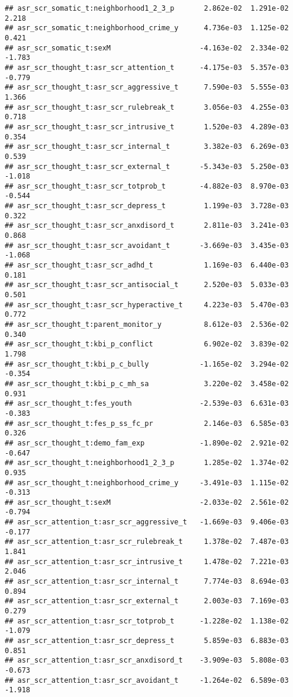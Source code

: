 \documentclass[
]{article}
\begin{document}
\begin{verbatim}
## asr_scr_somatic_t:neighborhood1_2_3_p       2.862e-02  1.291e-02   2.218
## asr_scr_somatic_t:neighborhood_crime_y      4.736e-03  1.125e-02   0.421
## asr_scr_somatic_t:sexM                     -4.163e-02  2.334e-02  -1.783
## asr_scr_thought_t:asr_scr_attention_t      -4.175e-03  5.357e-03  -0.779
## asr_scr_thought_t:asr_scr_aggressive_t      7.590e-03  5.555e-03   1.366
## asr_scr_thought_t:asr_scr_rulebreak_t       3.056e-03  4.255e-03   0.718
## asr_scr_thought_t:asr_scr_intrusive_t       1.520e-03  4.289e-03   0.354
## asr_scr_thought_t:asr_scr_internal_t        3.382e-03  6.269e-03   0.539
## asr_scr_thought_t:asr_scr_external_t       -5.343e-03  5.250e-03  -1.018
## asr_scr_thought_t:asr_scr_totprob_t        -4.882e-03  8.970e-03  -0.544
## asr_scr_thought_t:asr_scr_depress_t         1.199e-03  3.728e-03   0.322
## asr_scr_thought_t:asr_scr_anxdisord_t       2.811e-03  3.241e-03   0.868
## asr_scr_thought_t:asr_scr_avoidant_t       -3.669e-03  3.435e-03  -1.068
## asr_scr_thought_t:asr_scr_adhd_t            1.169e-03  6.440e-03   0.181
## asr_scr_thought_t:asr_scr_antisocial_t      2.520e-03  5.033e-03   0.501
## asr_scr_thought_t:asr_scr_hyperactive_t     4.223e-03  5.470e-03   0.772
## asr_scr_thought_t:parent_monitor_y          8.612e-03  2.536e-02   0.340
## asr_scr_thought_t:kbi_p_conflict            6.902e-02  3.839e-02   1.798
## asr_scr_thought_t:kbi_p_c_bully            -1.165e-02  3.294e-02  -0.354
## asr_scr_thought_t:kbi_p_c_mh_sa             3.220e-02  3.458e-02   0.931
## asr_scr_thought_t:fes_youth                -2.539e-03  6.631e-03  -0.383
## asr_scr_thought_t:fes_p_ss_fc_pr            2.146e-03  6.585e-03   0.326
## asr_scr_thought_t:demo_fam_exp             -1.890e-02  2.921e-02  -0.647
## asr_scr_thought_t:neighborhood1_2_3_p       1.285e-02  1.374e-02   0.935
## asr_scr_thought_t:neighborhood_crime_y     -3.491e-03  1.115e-02  -0.313
## asr_scr_thought_t:sexM                     -2.033e-02  2.561e-02  -0.794
## asr_scr_attention_t:asr_scr_aggressive_t   -1.669e-03  9.406e-03  -0.177
## asr_scr_attention_t:asr_scr_rulebreak_t     1.378e-02  7.487e-03   1.841
## asr_scr_attention_t:asr_scr_intrusive_t     1.478e-02  7.221e-03   2.046
## asr_scr_attention_t:asr_scr_internal_t      7.774e-03  8.694e-03   0.894
## asr_scr_attention_t:asr_scr_external_t      2.003e-03  7.169e-03   0.279
## asr_scr_attention_t:asr_scr_totprob_t      -1.228e-02  1.138e-02  -1.079
## asr_scr_attention_t:asr_scr_depress_t       5.859e-03  6.883e-03   0.851
## asr_scr_attention_t:asr_scr_anxdisord_t    -3.909e-03  5.808e-03  -0.673
## asr_scr_attention_t:asr_scr_avoidant_t     -1.264e-02  6.589e-03  -1.918

\end{verbatim}
\end{document}
